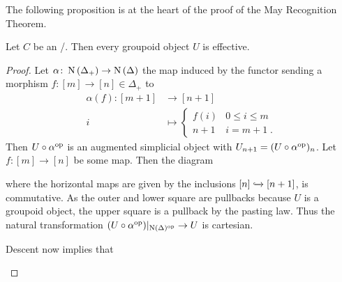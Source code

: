 The following proposition is at the heart of the proof of the May Recognition Theorem.
\begin{prop}\label{prop:groupoidObjInToposAreEffective} %
    Let $C$ be an \inftytop/.
    Then every groupoid object $U$ is effective.
    \begin{proof}
        Let $\alpha\colon\operatorname{N}\left(\Delta_+\right)\to\operatorname{N}\left(\Delta\right)$ the map induced by the functor sending a morphism $f\colon [m]\to[n]\in\Delta_+$ to 
        \begin{align*}
            \alpha(f)\colon [m+1]&\to[n+1]\\
            i&\mapsto
            \begin{cases}
                f(i) & 0\leq i\leq m\\
                n+1 & i=m+1\;.
            \end{cases}
        \end{align*}
        Then $U\circ\alpha^{\operatorname{op}}$ is an augmented simplicial object with $U_{n+1}=(U\circ\alpha^{\operatorname{op}})_n$.
        Let $f\colon [m]\to[n]$ be some map. Then the diagram
        \begin{center}
        \end{center}
        where the horizontal maps are given by the inclusions $[n]\xhookrightarrow{}[n+1]$, is commutative. 
        As the outer and lower square are pullbacks because $U$ is a groupoid object, the upper square is a pullback by the pasting law.
        Thus the natural transformation $(U\circ\alpha^{\operatorname{op}})|_{\operatorname{N}(\Delta)^{\operatorname{op}}}\to U$ is cartesian.

        Descent now implies that 
        \begin{center}
\end{center}
\end{proof}
\end{prop}
